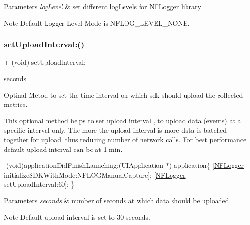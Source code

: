 \begin{DoxyParams}{Parameters}
{\em log\+Level} & set different log\+Levels for \hyperlink{interface_n_f_logger}{N\+F\+Logger} library \\
\hline
\end{DoxyParams}
\begin{DoxyNote}{Note}
Default Logger Level Mode is N\+F\+L\+O\+G\+\_\+\+L\+E\+V\+E\+L\+\_\+\+N\+O\+NE. 
\end{DoxyNote}
\mbox{\label{interface_n_f_logger_abab12d34a22ef54d94e9c1f32f785bbd}} 
\subsubsection{\texorpdfstring{set\+Upload\+Interval\+:()}{setUploadInterval:()}}
{\footnotesize\ttfamily + (void) set\+Upload\+Interval\+: \begin{DoxyParamCaption}\item[{(N\+S\+Integer)}]{seconds }\end{DoxyParamCaption}}



Optinal Metod to set the time interval on which sdk should upload the collected metrics. 

This optional method helps to set upload interval , to upload data (events) at a specific interval only. The more the upload interval is more data is batched together for upload, thus reducing number of network calls. For best performance default upload interval can be at 1 min.


\begin{DoxyCode}
-(void)applicationDidFinishLaunching:(UIApplication *) application\{
     [\hyperlink{interface_n_f_logger}{NFLogger} initializeSDKWithMode:NFLOGManualCapture];
     [\hyperlink{interface_n_f_logger}{NFLogger} setUploadInterval:60];
\}
\end{DoxyCode}



\begin{DoxyParams}{Parameters}
{\em seconds} & number of seconds at which data should be uploaded.\\
\hline
\end{DoxyParams}
\begin{DoxyNote}{Note}
Default upload interval is set to 30 seconds. 
\end{DoxyNote}
\mbox{\label{interface_n_f_logger_a2d98749d91d892500fab101747d06a71}} 
